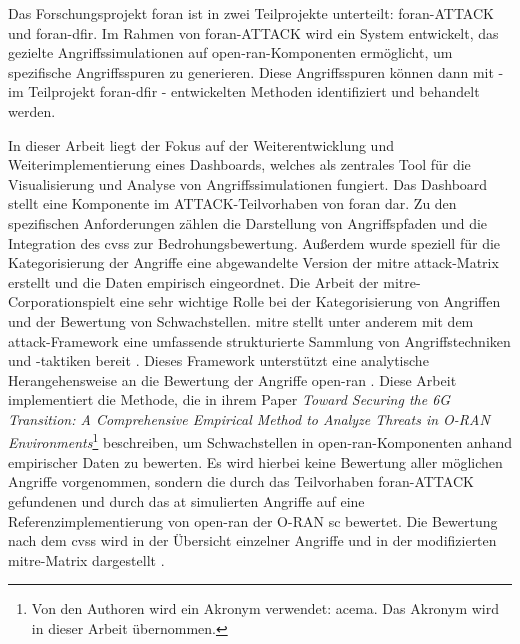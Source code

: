 \par Das Forschungsprojekt \gls{foran} ist in zwei Teilprojekte unterteilt: \gls{foran}-ATTACK und \gls{foran}-\gls{dfir}. Im Rahmen von \gls{foran}-ATTACK wird ein System entwickelt, das gezielte Angriffssimulationen auf \gls{open-ran}-Komponenten ermöglicht, um spezifische Angriffsspuren zu generieren. Diese Angriffsspuren können dann mit - im Teilprojekt \gls{foran}-\gls{dfir} - entwickelten Methoden identifiziert und behandelt werden.
\par In dieser Arbeit liegt der Fokus auf der Weiterentwicklung und Weiterimplementierung eines Dashboards, welches als zentrales Tool für die Visualisierung und Analyse von Angriffssimulationen fungiert. Das Dashboard stellt eine Komponente im ATTACK-Teilvorhaben von \gls{foran} dar. Zu den spezifischen Anforderungen zählen die Darstellung von Angriffspfaden und die Integration des \gls{cvss} zur Bedrohungsbewertung. Außerdem wurde speziell für die Kategorisierung der Angriffe eine abgewandelte Version der \gls{mitre} \gls{attack}-Matrix erstellt und die Daten empirisch eingeordnet. Die Arbeit der \gls{mitre}-Corporationspielt eine sehr wichtige Rolle bei der Kategorisierung von Angriffen und der Bewertung von Schwachstellen. \gls{mitre} stellt unter anderem mit dem \gls{attack}-Framework eine umfassende strukturierte Sammlung von Angriffstechniken und -taktiken bereit \autocite{SolvingProblemsSafer2024,MITREATTCK}. Dieses Framework unterstützt eine analytische Herangehensweise an die Bewertung der Angriffe \gls{open-ran} \autocite{dieterichDevelopmentAdversarySimulation2024}. Diese Arbeit implementiert die Methode, die \citeauthor{klementSecuring6GTransition2024} in ihrem Paper \textit{Toward Securing the 6G Transition: A Comprehensive Empirical Method to Analyze Threats in O-RAN Environments}\footnote{Von den Authoren wird ein Akronym verwendet: \gls{acema}. Das Akronym wird in dieser Arbeit übernommen.} beschreiben, um Schwachstellen in \gls{open-ran}-Komponenten anhand empirischer Daten zu bewerten. Es wird hierbei keine Bewertung aller möglichen Angriffe vorgenommen, sondern die durch das Teilvorhaben \gls{foran}-ATTACK gefundenen und durch das \gls{at} simulierten Angriffe auf eine Referenzimplementierung von \gls{open-ran} der O-RAN \gls{sc} bewertet. Die Bewertung nach dem \gls{cvss} wird in der Übersicht einzelner Angriffe und in der modifizierten \gls{mitre}-Matrix dargestellt \autocite{dieterichDevelopmentAdversarySimulation2024,klementSecuring6GTransition2024}.